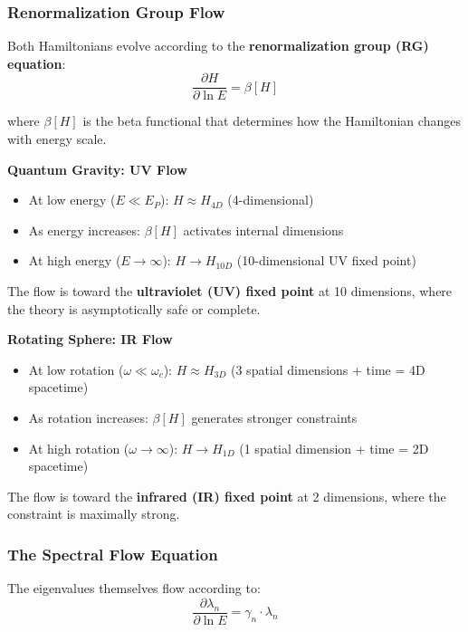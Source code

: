\documentclass[UTF8]{ctex}\n\documentclass[12pt,a4paper]{article}
\begin{document}
\subsubsection{Renormalization Group Flow}

Both Hamiltonians evolve according to the \textbf{renormalization group (RG) equation}:
\begin{equation}
    \frac{\partial H}{\partial \ln E} = \beta[H]
\end{equation}

where $\beta[H]$ is the beta functional that determines how the Hamiltonian changes with energy scale.

\textbf{Quantum Gravity: UV Flow}
\begin{itemize}
    \item At low energy ($E \ll E_P$): $H \approx H_{4D}$ (4-dimensional)
    \item As energy increases: $\beta[H]$ activates internal dimensions
    \item At high energy ($E \to \infty$): $H \to H_{10D}$ (10-dimensional UV fixed point)
\end{itemize}

The flow is toward the \textbf{ultraviolet (UV) fixed point} at 10 dimensions, where the theory is asymptotically safe or complete.

\textbf{Rotating Sphere: IR Flow}
\begin{itemize}
    \item At low rotation ($\omega \ll \omega_c$): $H \approx H_{3D}$ (3 spatial dimensions + time = 4D spacetime)
    \item As rotation increases: $\beta[H]$ generates stronger constraints
    \item At high rotation ($\omega \to \infty$): $H \to H_{1D}$ (1 spatial dimension + time = 2D spacetime)
\end{itemize}

The flow is toward the \textbf{infrared (IR) fixed point} at 2 dimensions, where the constraint is maximally strong.

\subsubsection{The Spectral Flow Equation}

The eigenvalues themselves flow according to:
\begin{equation}
    \frac{\partial \lambda_n}{\partial \ln E} = \gamma_n \cdot \lambda_n
\end{equation}
\end{document}
